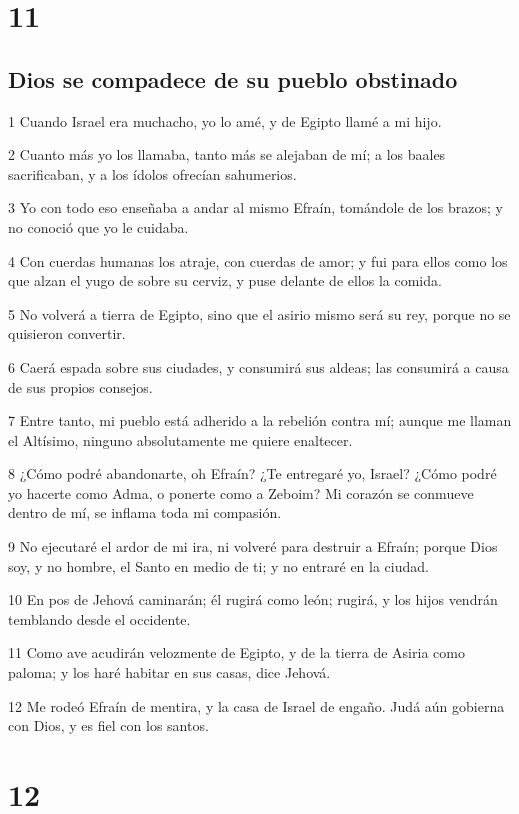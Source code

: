 \chapter{11}

\section*{Dios se compadece de su pueblo obstinado}

\par 1 Cuando Israel era muchacho, yo lo amé, y de Egipto llamé a mi hijo. 
\par 2 Cuanto más yo los llamaba, tanto más se alejaban de mí; a los baales sacrificaban, y a los ídolos ofrecían sahumerios.
\par 3 Yo con todo eso enseñaba a andar al mismo Efraín, tomándole de los brazos; y no conoció que yo le cuidaba.
\par 4 Con cuerdas humanas los atraje, con cuerdas de amor; y fui para ellos como los que alzan el yugo de sobre su cerviz, y puse delante de ellos la comida.
\par 5 No volverá a tierra de Egipto, sino que el asirio mismo será su rey, porque no se quisieron convertir.
\par 6 Caerá espada sobre sus ciudades, y consumirá sus aldeas; las consumirá a causa de sus propios consejos. 
\par 7 Entre tanto, mi pueblo está adherido a la rebelión contra mí; aunque me llaman el Altísimo, ninguno absolutamente me quiere enaltecer.
\par 8 ¿Cómo podré abandonarte, oh Efraín? ¿Te entregaré yo, Israel? ¿Cómo podré yo hacerte como Adma, o ponerte como a Zeboim? Mi corazón se conmueve dentro de mí, se inflama toda mi compasión.
\par 9 No ejecutaré el ardor de mi ira, ni volveré para destruir a Efraín; porque Dios soy, y no hombre, el Santo en medio de ti; y no entraré en la ciudad.
\par 10 En pos de Jehová caminarán; él rugirá como león; rugirá, y los hijos vendrán temblando desde el occidente.
\par 11 Como ave acudirán velozmente de Egipto, y de la tierra de Asiria como paloma; y los haré habitar en sus casas, dice Jehová. 
\par 12 Me rodeó Efraín de mentira, y la casa de Israel de engaño. Judá aún gobierna con Dios, y es fiel con los santos.

\chapter{12}


